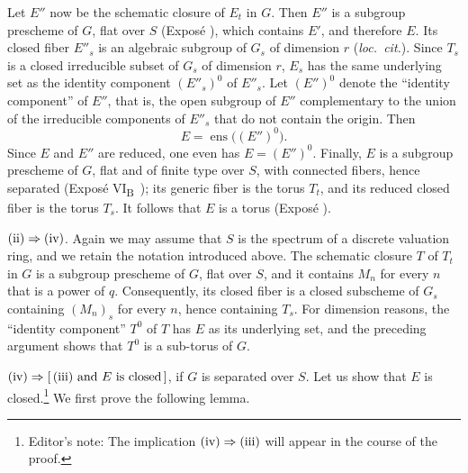 Let \(E''\) now be the schematic closure of \(E_t\) in \(G\). Then
\(E''\) is a subgroup prescheme of \(G\), flat over \(S\)
(Exposé ), which contains \(E'\), and therefore \(E\). Its
closed fiber \(E''_s\) is an algebraic subgroup of \(G_s\) of
dimension \(r\) (\emph{loc.\ cit.}). Since \(T_s\) is a closed
irreducible subset of \(G_s\) of dimension \(r\), \(E_s\) has the
same underlying set as the identity component \((E''_s)^0\) of
\(E''_s\). Let \((E'')^0\) denote the ``identity component'' of
\(E''\), that is, the open subgroup of \(E''\) complementary to the
union of the irreducible components of \(E''_s\) that do not contain
the origin. Then
\[
  E=\operatorname{ens}\bigl((E'')^0\bigr).
\]
Since \(E\) and \(E''\) are reduced, one even has
\(E=(E'')^0\). Finally, \(E\) is a subgroup prescheme of \(G\), flat
and of finite type over \(S\), with connected fibers, hence separated
(Exposé VI\textsubscript{B}~); its generic fiber is the torus
\(T_t\), and its reduced closed fiber is the torus \(T_s\). It follows
that \(E\) is a torus (Exposé ).

\medskip
\noindent\(\textup{(ii)}\Rightarrow\textup{(iv)}\).
Again we may assume that \(S\) is the spectrum of a discrete valuation
ring, and we retain the notation introduced above. The schematic
closure \(T\) of \(T_t\) in \(G\) is a subgroup prescheme of \(G\),
flat over \(S\), and it contains \(M_n\) for every \(n\) that is a
power of \(q\). Consequently, its closed fiber is a closed subscheme
of \(G_s\) containing \((M_n)_s\) for every \(n\), hence containing
\(T_s\). For dimension reasons, the ``identity component'' \(T^0\)
of \(T\) has \(E\) as its underlying set, and the preceding argument
shows that \(T^0\) is a sub-torus of \(G\).

\medskip
\noindent\(\textup{(iv)}\Rightarrow
[\,\textup{(iii)}\text{ and }E\text{ is closed}\,]\), if \(G\) is
separated over \(S\). Let us show that \(E\) is
closed.\footnote{Editor's note: The implication
\(\textup{(iv)}\Rightarrow\textup{(iii)}\) will appear in the course
of the proof.} We first prove the following lemma.


